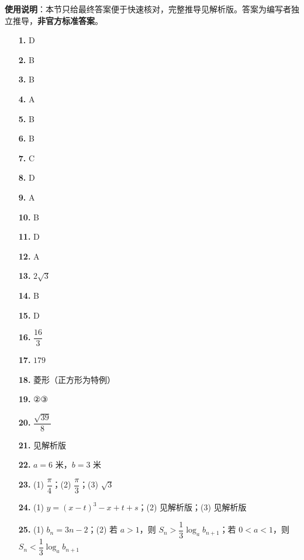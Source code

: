 
\begin{gknotice}
\textbf{使用说明}：本节只给最终答案便于快速核对，完整推导见解析版。答案为编写者独立推导，\textbf{非官方标准答案}。
\end{gknotice}

\begin{itemize}[leftmargin=2.6em]
  \item[\textbf{1.}] D
  \item[\textbf{2.}] B
  \item[\textbf{3.}] B
  \item[\textbf{4.}] A
  \item[\textbf{5.}] B
  \item[\textbf{6.}] B
  \item[\textbf{7.}] C
  \item[\textbf{8.}] D
  \item[\textbf{9.}] A
  \item[\textbf{10.}] B
  \item[\textbf{11.}] D
  \item[\textbf{12.}] A
  \item[\textbf{13.}] $2\sqrt3$
  \item[\textbf{14.}] B
  \item[\textbf{15.}] D
  \item[\textbf{16.}] $\dfrac{16}{3}$
  \item[\textbf{17.}] $179$
  \item[\textbf{18.}] 菱形（正方形为特例）
  \item[\textbf{19.}] ②③
  \item[\textbf{20.}] $\dfrac{\sqrt{39}}8$
  \item[\textbf{21.}] 见解析版
  \item[\textbf{22.}] $a=6$ 米，$b=3$ 米
  \item[\textbf{23.}] (1) $\dfrac\pi4$；(2) $\dfrac\pi3$；(3) $\sqrt3$
  \item[\textbf{24.}] (1) $y=(x-t)^3-x+t+s$；(2) 见解析版；(3) 见解析版
  \item[\textbf{25.}] (1) $b_n=3n-2$；(2) 若 $a>1$，则 $S_n>\dfrac13\log_a b_{n+1}$；若 $0<a<1$，则 $S_n<\dfrac13\log_a b_{n+1}$
\end{itemize}
